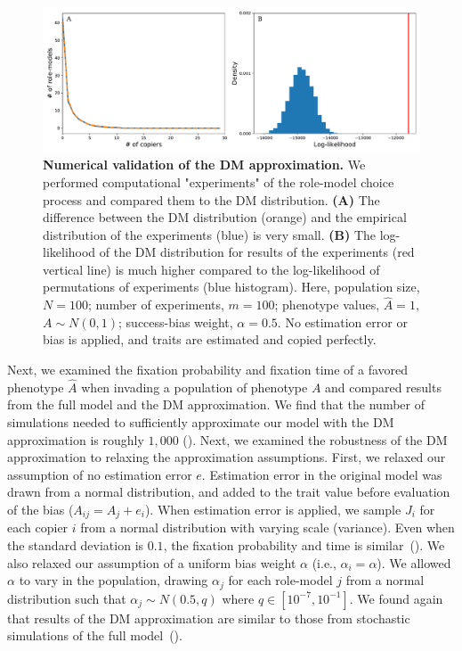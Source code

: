 \documentclass[12pt]{extarticle}
\begin{document}
\begin{figure}[h]
    \includegraphics[width=\linewidth]{../figures/final/DM_validation.pdf}
  \caption{
  \textbf{Numerical validation of the DM approximation.}
  We performed computational "experiments" of the role-model choice process and compared them to the DM distribution. 
  \textbf{(A)} The difference between the DM distribution (orange) and the empirical distribution of the experiments (blue) is very small. 
  \textbf{(B)} The log-likelihood of the DM distribution for results of the experiments (red vertical line) is much higher compared to the log-likelihood of permutations of experiments (blue histogram).
  Here, population size, $N=100$; number of experiments, $m=100$; phenotype values, $\hat{A}=1$, $A \sim N(0,1)$; success-bias weight, $\alpha=0.5$.
  No estimation error or bias is applied, and traits are estimated and copied perfectly.}	
  \label{fig:DM_validation}
\end{figure}


Next, we examined the fixation probability and fixation time of a favored phenotype $\hat{A}$ when invading a population of phenotype $A$ and compared results from the full model and the DM approximation.
We find that the number of simulations needed to sufficiently approximate our model with the DM approximation is roughly $1,000$ ().
Next, we examined the robustness of the DM approximation to relaxing the approximation assumptions.
First, we relaxed our assumption of no estimation error $e$.
Estimation error in the original model was drawn from a normal distribution, and added to the trait value before evaluation of the bias ($A_{ij} = A_j + e_i$).
When estimation error is applied, we sample $J_i$ for each copier $i$ from a normal distribution with varying scale (variance).
Even when the standard deviation is $0.1$, the fixation probability and time is similar~(). 
We also relaxed our assumption of a uniform bias weight $\alpha$ (i.e., $\alpha_i=\alpha$). We allowed $\alpha$ to vary in the population, drawing $\alpha_j$ for each role-model $j$ from a normal distribution such that $\alpha_j \sim N(0.5,q)$ where $q \in [10^{-7},10^{-1}]$. 
We found again that results of the DM approximation are similar to those from stochastic simulations of the full model~().
\end{document}

